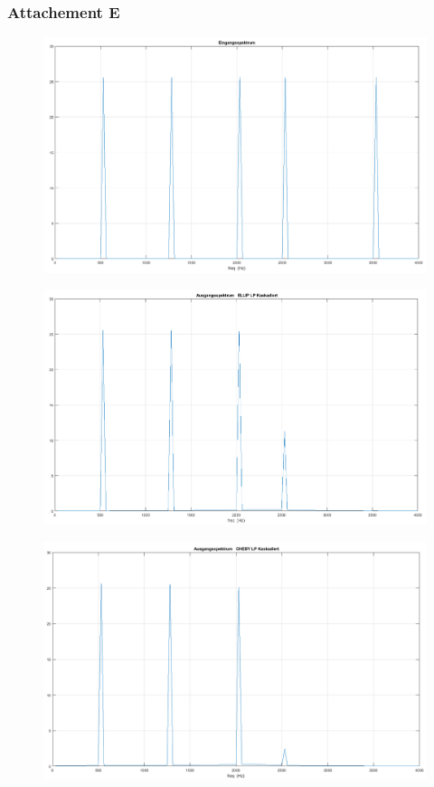 \subsubsection{Attachement E}


\begin{figure}
\centering
\includegraphics[width=0.7\linewidth]{Bilder/Attachment_E_Eingangsspektrum}
\caption{}
\label{fig:Attachment_E_Eingangsspektrum}
\end{figure}


\begin{figure}
\centering
\includegraphics[width=0.7\linewidth]{Bilder/Attachment_E_ELLIP_LP_Spektrum}
\caption{}
\label{fig:Attachment_E_ELLIP_LP_Spektrum}
\end{figure}


\begin{figure}
\centering
\includegraphics[width=0.7\linewidth]{Bilder/Attachment_E_CHEBY_LP_Spektrum}
\caption{}
\label{fig:Attachment_E_CHEBY_LP_Spektrum}
\end{figure}

